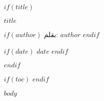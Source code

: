 \documentclass[12pt,oneside,openany]{book}
\begin{document}
\setRTL

$if(title)$
\begin{titlepage}
\begin{center}
\vspace*{2cm}
{\Huge\bfseries $title$}
\vspace{1cm}

$if(author)$
{\Large بقلم: $author$}
\vspace{0.5cm}
$endif$

$if(date)$
{\large $date$}
$endif$
\end{center}
\end{titlepage}
\clearpage
$endif$

$if(toc)$
\tableofcontents
\clearpage
$endif$

$body$
\end{document}
